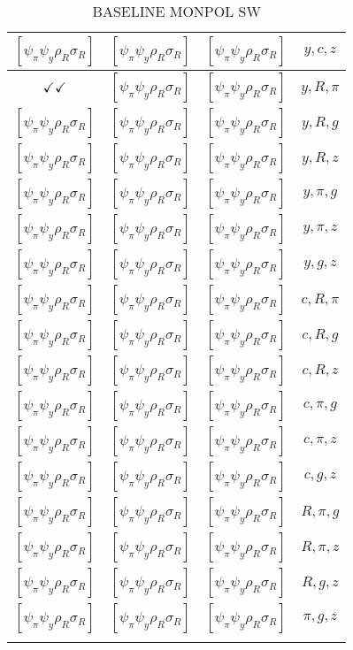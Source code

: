 \documentclass[a4paper,10pt]{article}
\begin{document}
\begin{longtable}{|c|c|c|c|}
\hline
$[\psi_\pi \psi_y \rho_R \sigma_R ]$ & $[\psi_\pi \psi_y \rho_R \sigma_R ]$ & $[\psi_\pi \psi_y \rho_R \sigma_R ]$ & ${y},{c},{z}$ \\
\hline
$\checkmark\checkmark$ & $[\psi_\pi \psi_y \rho_R \sigma_R ]$ & $[\psi_\pi \psi_y \rho_R \sigma_R ]$ & ${y},{R},{\pi}$ \\
\hline
$[\psi_\pi \psi_y \rho_R \sigma_R ]$ & $[\psi_\pi \psi_y \rho_R \sigma_R ]$ & $[\psi_\pi \psi_y \rho_R \sigma_R ]$ & ${y},{R},{g}$ \\
\hline
$[\psi_\pi \psi_y \rho_R \sigma_R ]$ & $[\psi_\pi \psi_y \rho_R \sigma_R ]$ & $[\psi_\pi \psi_y \rho_R \sigma_R ]$ & ${y},{R},{z}$ \\
\hline
$[\psi_\pi \psi_y \rho_R \sigma_R ]$ & $[\psi_\pi \psi_y \rho_R \sigma_R ]$ & $[\psi_\pi \psi_y \rho_R \sigma_R ]$ & ${y},{\pi},{g}$ \\
\hline
$[\psi_\pi \psi_y \rho_R \sigma_R ]$ & $[\psi_\pi \psi_y \rho_R \sigma_R ]$ & $[\psi_\pi \psi_y \rho_R \sigma_R ]$ & ${y},{\pi},{z}$ \\
\hline
$[\psi_\pi \psi_y \rho_R \sigma_R ]$ & $[\psi_\pi \psi_y \rho_R \sigma_R ]$ & $[\psi_\pi \psi_y \rho_R \sigma_R ]$ & ${y},{g},{z}$ \\
\hline
$[\psi_\pi \psi_y \rho_R \sigma_R ]$ & $[\psi_\pi \psi_y \rho_R \sigma_R ]$ & $[\psi_\pi \psi_y \rho_R \sigma_R ]$ & ${c},{R},{\pi}$ \\
\hline
$[\psi_\pi \psi_y \rho_R \sigma_R ]$ & $[\psi_\pi \psi_y \rho_R \sigma_R ]$ & $[\psi_\pi \psi_y \rho_R \sigma_R ]$ & ${c},{R},{g}$ \\
\hline
$[\psi_\pi \psi_y \rho_R \sigma_R ]$ & $[\psi_\pi \psi_y \rho_R \sigma_R ]$ & $[\psi_\pi \psi_y \rho_R \sigma_R ]$ & ${c},{R},{z}$ \\
\hline
$[\psi_\pi \psi_y \rho_R \sigma_R ]$ & $[\psi_\pi \psi_y \rho_R \sigma_R ]$ & $[\psi_\pi \psi_y \rho_R \sigma_R ]$ & ${c},{\pi},{g}$ \\
\hline
$[\psi_\pi \psi_y \rho_R \sigma_R ]$ & $[\psi_\pi \psi_y \rho_R \sigma_R ]$ & $[\psi_\pi \psi_y \rho_R \sigma_R ]$ & ${c},{\pi},{z}$ \\
\hline
$[\psi_\pi \psi_y \rho_R \sigma_R ]$ & $[\psi_\pi \psi_y \rho_R \sigma_R ]$ & $[\psi_\pi \psi_y \rho_R \sigma_R ]$ & ${c},{g},{z}$ \\
\hline
$[\psi_\pi \psi_y \rho_R \sigma_R ]$ & $[\psi_\pi \psi_y \rho_R \sigma_R ]$ & $[\psi_\pi \psi_y \rho_R \sigma_R ]$ & ${R},{\pi},{g}$ \\
\hline
$[\psi_\pi \psi_y \rho_R \sigma_R ]$ & $[\psi_\pi \psi_y \rho_R \sigma_R ]$ & $[\psi_\pi \psi_y \rho_R \sigma_R ]$ & ${R},{\pi},{z}$ \\
\hline
$[\psi_\pi \psi_y \rho_R \sigma_R ]$ & $[\psi_\pi \psi_y \rho_R \sigma_R ]$ & $[\psi_\pi \psi_y \rho_R \sigma_R ]$ & ${R},{g},{z}$ \\
\hline
$[\psi_\pi \psi_y \rho_R \sigma_R ]$ & $[\psi_\pi \psi_y \rho_R \sigma_R ]$ & $[\psi_\pi \psi_y \rho_R \sigma_R ]$ & ${\pi},{g},{z}$ \\
\hline
\caption{BASELINE MONPOL SW}
\label{table:MyTableLabel}
\end{longtable}
\end{document}
